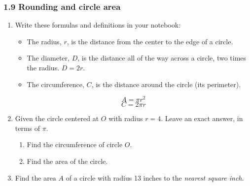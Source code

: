 

\fancyhead[LE]{\thepage}



\subsubsection*{1.9 Rounding and circle area}
\begin{enumerate}
\item Write these formulas and definitions in your notebook:
  \begin{itemize}
    \item The radius, $r$, is the distance from the center to the edge of a circle. 
    \item The diameter, $D$, is the distance all of the way across a circle, two times the radius. $D=2r$. 
    \item The circumference, $C$, is the distance around the circle (its perimeter).
  \end{itemize}
  \[A=\pi r^2\]
  \[C= 2\pi r\]

\item Given the circle centered at $O$ with radius $r=4$. Leave an exact answer, in terms of $\pi$.
  \begin{multicols}{2}
    \begin{enumerate}
      \item Find the circumference of circle $O$. %
      \item Find the area of the circle.\vspace{2cm}
    \end{enumerate}
  \end{multicols}

\item Find the area $A$ of a circle with radius 13 inches to the \emph{nearest square inch}. \vspace{2cm}


\end{enumerate}
